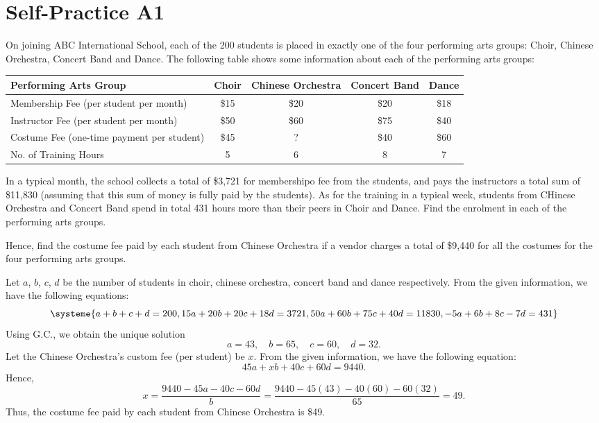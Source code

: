 \section{Self-Practice A1}

\begin{problem}
    On joining ABC International School, each of the 200 students is placed in exactly one of the four performing arts groups: Choir, Chinese Orchestra, Concert Band and Dance. The following table shows some information about each of the performing arts groups:

    \begin{table}[H]
        \centering
        \begin{tabularx}{\textwidth}{|>{\centering}X|c|c|c|c|}
        \hline
        \textbf{Performing Arts Group} & \textbf{Choir} & \textbf{Chinese Orchestra} & \textbf{Concert Band} & \textbf{Dance} \\ \hline
        Membership Fee (per student per month) & \$15 & \$20 & \$20 & \$18 \\ \hline
        Instructor Fee (per student per month) & \$50 & \$60 & \$75 & \$40 \\ \hline
        Costume Fee (one-time payment per student) & \$45 & ? & \$40 & \$60 \\ \hline
        No. of Training Hours & 5 & 6 & 8 & 7 \\ \hline
        \end{tabularx}
    \end{table}

    In a typical month, the school collects a total of \$3,721 for membershipo fee from the students, and pays the instructors a total sum of \$11,830 (assuming that this sum of money is fully paid by the students). As for the training in a typical week, students from CHinese Orchestra and Concert Band spend in total 431 hours more than their peers in Choir and Dance. Find the enrolment in each of the performing arts groups.

    Hence, find the costume fee paid by each student from Chinese Orchestra if a vendor charges a total of \$9,440 for all the costumes for the four performing arts groups.
\end{problem}
\begin{solution}
    Let $a$, $b$, $c$, $d$ be the number of students in choir, chinese orchestra, concert band and dance respectively. From the given information, we have the following equations: \[\systeme{a+b+c+d=200,15a + 20b + 20c + 18d = 3721,50a+60b+75c+40d=11830,-5a+6b+8c-7d=431}\] Using G.C., we obtain the unique solution \[a = 43, \quad b = 65, \quad c = 60, \quad d = 32.\] Let the Chinese Orchestra's custom fee (per student) be $x$. From the given information, we have the following equation: \[45a + xb + 40c + 60d = 9440.\] Hence, \[x = \frac{9440 - 45a - 40c - 60d}{b} = \frac{9440 - 45(43) - 40(60) - 60(32)}{65} = 49.\] Thus, the costume fee paid by each student from Chinese Orchestra is \$49.
\end{solution}

